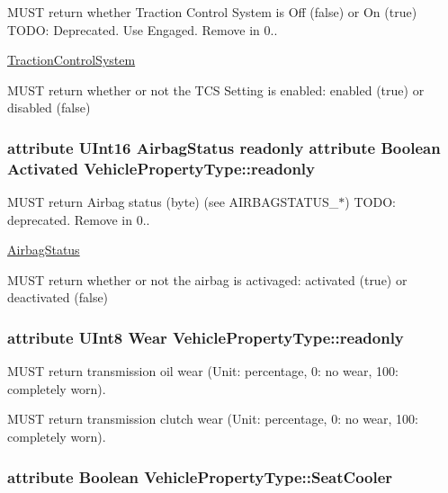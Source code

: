 M\+U\+S\+T return whether Traction Control System is Off (false) or On (true) T\+O\+D\+O\+: Deprecated. Use Engaged. Remove in 0.. 

\hyperlink{interfaceTractionControlSystem}{Traction\+Control\+System}

M\+U\+S\+T return whether or not the T\+C\+S Setting is enabled\+: enabled (true) or disabled (false) \hypertarget{interfaceVehiclePropertyType_a85640ae0f23f03d2f35b9d8a3040f1d2}{
\subsubsection[{readonly}]{\setlength{\rightskip}{0pt plus 5cm}attribute U\+Int16 {\bf Airbag\+Status} readonly attribute Boolean Activated Vehicle\+Property\+Type\+::readonly}}\label{interfaceVehiclePropertyType_a85640ae0f23f03d2f35b9d8a3040f1d2}


M\+U\+S\+T return Airbag status (byte) (see A\+I\+R\+B\+A\+G\+S\+T\+A\+T\+U\+S\+\_\+$\ast$) T\+O\+D\+O\+: deprecated. Remove in 0.. 

\hyperlink{interfaceAirbagStatus}{Airbag\+Status}

M\+U\+S\+T return whether or not the airbag is activaged\+: activated (true) or deactivated (false) \hypertarget{interfaceVehiclePropertyType_ae88854adacffc7b96a8afca00d2e6407}{
\subsubsection[{readonly}]{\setlength{\rightskip}{0pt plus 5cm}attribute U\+Int8 Wear Vehicle\+Property\+Type\+::readonly}}\label{interfaceVehiclePropertyType_ae88854adacffc7b96a8afca00d2e6407}


M\+U\+S\+T return transmission oil wear (Unit\+: percentage, 0\+: no wear, 100\+: completely worn). 

M\+U\+S\+T return transmission clutch wear (Unit\+: percentage, 0\+: no wear, 100\+: completely worn). \hypertarget{interfaceVehiclePropertyType_aa6e78716c3c9d68fbeaae573d142a8db}{
\subsubsection[{Seat\+Cooler}]{\setlength{\rightskip}{0pt plus 5cm}attribute Boolean Vehicle\+Property\+Type\+::\+Seat\+Cooler}}\label{interfaceVehiclePropertyType_aa6e78716c3c9d68fbeaae573d142a8db}


